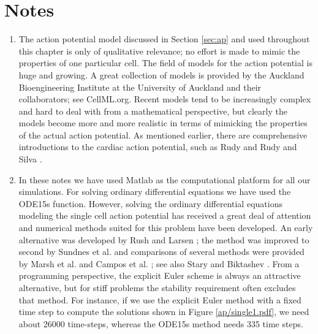\clearpage
\section{Notes}
\begin{enumerate}
\item The action potential model discussed in Section \ref{sec:ap} and used throughout this chapter is only of qualitative relevance; no effort is made to mimic the properties of one particular cell. The field of models for the action potential is huge and growing. A great collection of models is provided by the Auckland Bioengineering Institute at the University of Auckland and their collaborators; see CellML.org. Recent models tend to be increasingly complex and hard to deal with from a mathematical perspective, but clearly the models become more and more realistic in terms of mimicking the properties of the actual action potential.  As mentioned earlier, there are comprehensive introductions to the cardiac action potential, such as Rudy \cite{Rudy2012} and Rudy and Silva \cite{Rudy2006}.
\item In these notes we have used Matlab as the computational platform for all our simulations. For solving ordinary differential equations we have used the ODE15s function. However, solving the ordinary differential equations modeling the single cell action potential has received a great deal of attention and numerical methods suited for this problem have been developed. An early alternative was developed by Rush and Larsen \cite{Rush1978}; the method was improved to second by Sundnes et al.  \cite{Sundnes2009} and comparisons of several methods were provided by Marsh et al. \cite{Marsh2012} and Campos et al. \cite{Campos2013}; see also Stary and Biktashev \cite{Stary2015}. From a programming perspective, the explicit Euler scheme is always an attractive alternative, but for stiff problems the stability requirement often excludes that method. For instance, if we use the explicit Euler method with a fixed time step to compute the solutions shown in  Figure \ref{ap/single1.pdf}, we need about 26000 time-steps, whereas the ODE15s method needs 335 time steps.

\end{enumerate}
